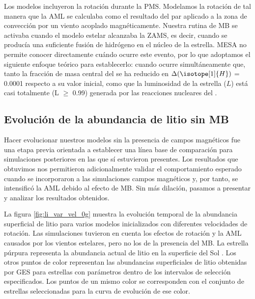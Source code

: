Los modelos incluyeron la rotación durante la PMS. Modelamos la rotación de tal manera que la AML se calculaba como el resultado del par aplicado a la zona de convección por un viento acoplado magnéticamente. Nuestra rutina de MB se activaba cuando el modelo estelar alcanzaba la ZAMS, es decir, cuando se producía una suficiente fusión de hidrógeno en el núcleo de la estrella. MESA no permite conocer directamente cuándo ocurre este evento, por lo que adoptamos el siguiente enfoque teórico para establecerlo: cuando ocurre simultáneamente que, tanto la fracción de masa central del  se ha reducido en $\Delta( \isotope[1]{H})$ = 0.0001 respecto a su valor inicial, como que la luminosidad de la estrella ($L$) está casi totalmente (L $\geq$ 0.99) generada por las reacciones nucleares del .\par

\subsection{Evolución de la abundancia de litio sin MB}
Hacer evolucionar nuestros modelos sin la presencia de campos magnéticos fue una etapa previa orientada a establecer una línea base de comparación para simulaciones posteriores en las que sí estuvieron presentes. Los resultados que obtuvimos nos permitieron adicionalmente validar el comportamiento esperado cuando se incorporaron a las simulaciones campos magnéticos y, por tanto, se intensificó la AML debido al efecto de MB. Sin más dilación, pasamos a presentar y analizar los resultados obtenidos.\par

La figura \ref{fig:li_var_vel_0g} muestra la evolución temporal de la abundancia superficial de litio para varios modelos inicializados con diferentes velocidades de rotación. Las simulaciones tuvieron en cuenta los efectos de rotación y la AML causados por los vientos estelares, pero no los de la presencia del MB. La estrella púrpura representa la abundancia actual de litio en la superficie del Sol \citep{Asplund2009}. Los otros puntos de color representan las abundancias superficiales de litio obtenidas por GES para estrellas con parámetros dentro de los intervalos de selección especificados. Los puntos de un mismo color se corresponden con el conjunto de estrellas seleccionadas para la curva de evolución de ese color.\par

